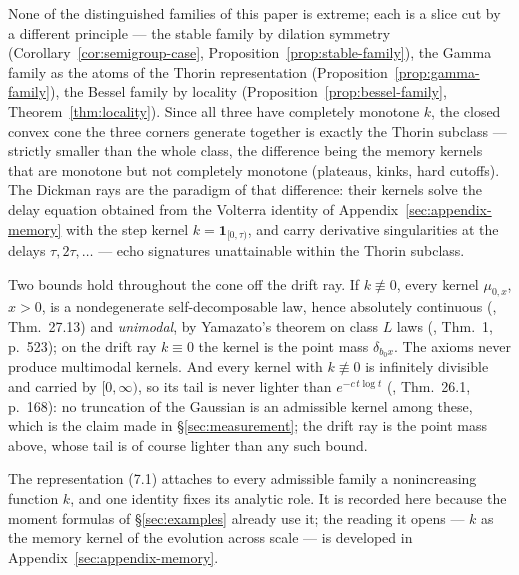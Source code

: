 \begin{remark}\label{rem:extreme-rays}
None of the distinguished families of this paper is extreme; each is a slice cut by a different
principle --- the stable family by dilation symmetry (Corollary~\ref{cor:semigroup-case},
Proposition~\ref{prop:stable-family}), the Gamma family as the atoms of the Thorin
representation (Proposition~\ref{prop:gamma-family}), the Bessel family by locality
(Proposition~\ref{prop:bessel-family}, Theorem~\ref{thm:locality}). Since all
three have completely monotone $k$, the closed convex cone the three corners generate together
is exactly the Thorin subclass --- strictly smaller than the whole class, the difference being
the memory kernels that are monotone but not completely monotone (plateaus, kinks, hard cutoffs). The
Dickman rays are the paradigm of that difference: their kernels solve the delay equation
obtained from the Volterra identity of Appendix~\ref{sec:appendix-memory} with the step kernel
$k = \mathbf{1}_{[0,\tau)}$, and carry derivative singularities at the delays
$\tau, 2\tau, \dots$ --- echo signatures unattainable within the Thorin subclass.

Two bounds hold throughout the cone off the drift ray. If $k \not\equiv 0$, every kernel
$\mu_{0,x}$, $x > 0$, is a nondegenerate self-decomposable law, hence absolutely continuous
(, Thm.~27.13) and \emph{unimodal}, by Yamazato's theorem on class $L$
laws (, Thm.~1, p.~523); on the drift ray $k \equiv 0$ the
kernel is the point mass $\delta_{b_0 x}$. The axioms never produce multimodal kernels. And
every kernel with $k \not\equiv 0$ is infinitely divisible and carried by $[0,\infty)$, so its
tail is never lighter than $e^{-c\,t\log t}$ (, Thm.~26.1, p.~168): no
truncation of the Gaussian is an admissible kernel among these, which is the claim made in
\S\ref{sec:measurement}; the drift ray is the point mass above, whose tail is of course lighter
than any such bound.
\end{remark}



The representation (7.1) attaches to every admissible family a nonincreasing function $k$,
and one identity fixes its analytic role. It is recorded here because the moment formulas of
\S\ref{sec:examples} already use it; the reading it opens --- $k$ as the memory kernel of the
evolution across scale --- is developed in Appendix~\ref{sec:appendix-memory}.

